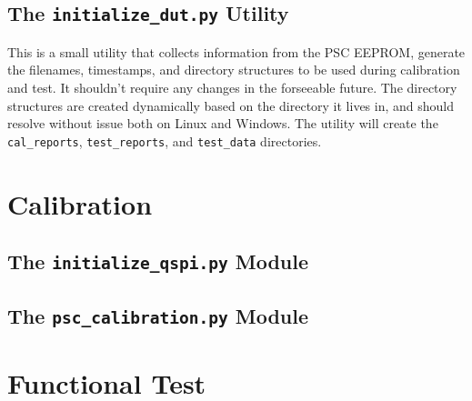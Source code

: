 \subsection{The \texttt{initialize\_dut.py} Utility}
This is a small utility that collects information from the PSC EEPROM, generate the filenames, timestamps, and directory structures to be used during calibration and test. It shouldn't require any changes in the forseeable future. The directory structures are created dynamically based on the directory it lives in, and should resolve without issue both on Linux and Windows. The utility will create the \texttt{cal\_reports}, \texttt{test\_reports}, and \texttt{test\_data} directories. 



\section{Calibration}
\subsection{The \texttt{initialize\_qspi.py} Module}

\subsection{The \texttt{psc\_calibration.py} Module}



\section{Functional Test}